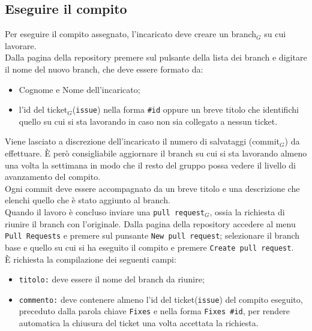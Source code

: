 \subsection{Eseguire il compito}
Per eseguire il compito assegnato, l'incaricato deve creare un branch$_{G}$ su cui lavorare. \\
Dalla pagina della repository premere sul pulsante della lista dei branch e digitare il nome del nuovo branch, che deve essere formato da:
    \begin{itemize}
    \item Cognome e Nome dell'incaricato;
    \item l'id del ticket$_{G}$(\texttt{issue}) nella forma \texttt{\#id} oppure un breve titolo che identifichi quello su cui si sta lavorando in caso non sia collegato a nessun ticket.
    \end{itemize}
Viene lasciato a discrezione dell'incaricato il numero di salvataggi (commit$_{G}$) da effettuare. È però consigliabile aggiornare il branch su cui si sta lavorando almeno una volta la settimana in modo che il resto del gruppo possa vedere il livello di avanzamento del compito. \\
Ogni commit deve essere accompagnato da un breve titolo e una descrizione che elenchi quello che è stato aggiunto al branch. \\
Quando il lavoro è concluso inviare una \texttt{pull request}$_{G}$, ossia la richiesta di riunire il branch con l'originale. Dalla pagina della repository accedere al menu \texttt{Pull Requests} e premere sul punsante \texttt{New pull request}; selezionare il branch base e quello su cui si ha eseguito il compito e premere \texttt{Create pull request}.\\ È richiesta la compilazione dei seguenti campi:
\begin{itemize}
    \item \texttt{titolo:} deve essere il nome del branch da riunire;
    \item \texttt{commento:} deve contenere almeno l'id del ticket(\texttt{issue}) del compito eseguito, preceduto dalla parola chiave \texttt{Fixes} e nella forma \texttt{Fixes \#id}, per rendere automatica la chiusura del ticket una volta accettata la richiesta. 
\end{itemize}

